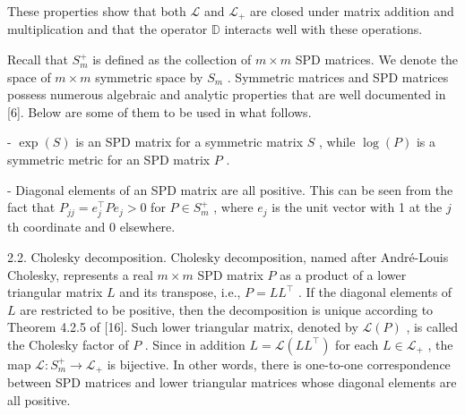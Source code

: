 \documentclass[11pt]{article}
\begin{document}
These properties show that both  $\mathcal{L}$  and  $\mathcal{L}_{+}$  are closed under matrix addition and multiplication and that the operator  $\mathbb{D}$  interacts well with these operations.

Recall that  $S_{m}^{+}$  is defined as the collection of  $m \times m$  SPD matrices. We denote the space of  $m \times m$  symmetric space by  $S_{m}$ . Symmetric matrices and SPD matrices possess numerous algebraic and analytic properties that are well documented in [6]. Below are some of them to be used in what follows.

-  $\exp(S)$  is an SPD matrix for a symmetric matrix  $S$ , while  $\log(P)$  is a symmetric metric for an SPD matrix  $P$ .

- Diagonal elements of an SPD matrix are all positive. This can be seen from the fact that  $P_{jj} = e_j^\top Pe_j > 0$  for  $P \in S_m^+$ , where  $e_j$  is the unit vector with 1 at the  $j$ th coordinate and 0 elsewhere.

2.2. Cholesky decomposition. Cholesky decomposition, named after André-Louis Cholesky, represents a real  $m \times m$  SPD matrix  $P$  as a product of a lower triangular matrix  $L$  and its transpose, i.e.,  $P = LL^{\top}$ . If the diagonal elements of  $L$  are restricted to be positive, then the decomposition is unique according to Theorem 4.2.5 of [16]. Such lower triangular matrix, denoted by  $\mathcal{L}(P)$ , is called the Cholesky factor of  $P$ . Since in addition  $L = \mathcal{L}(LL^{\top})$  for each  $L \in \mathcal{L}_{+}$ , the map  $\mathcal{L}: S_{m}^{+} \to \mathcal{L}_{+}$  is bijective. In other words, there is one-to-one correspondence between SPD matrices and lower triangular matrices whose diagonal elements are all positive.
\end{document}
